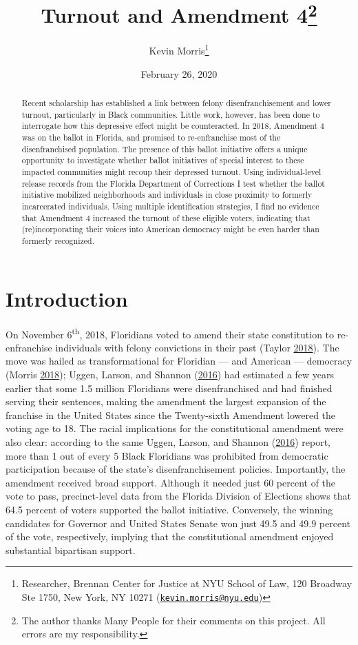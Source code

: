 \documentclass[
  12pt,
]{article}
\title{Turnout and Amendment 4\thanks{The author thanks Many People for their comments on this project. All errors are my responsibility.}}
\author{Kevin Morris\footnote{Researcher, Brennan Center for Justice at NYU School of Law, 120 Broadway Ste 1750, New York, NY 10271 (\href{mailto:kevin.morris@nyu.edu}{\nolinkurl{kevin.morris@nyu.edu}})}}
\date{February 26, 2020}
\begin{document}
\maketitle
\begin{abstract}
Recent scholarship has established a link between felony disenfranchisement and lower turnout, particularly in Black communities. Little work, however, has been done to interrogate how this depressive effect might be counteracted. In 2018, Amendment 4 was on the ballot in Florida, and promised to re-enfranchise most of the disenfranchised population. The presence of this ballot initiative offers a unique opportunity to investigate whether ballot initiatives of special interest to these impacted communities might recoup their depressed turnout. Using individual-level release records from the Florida Department of Corrections I test whether the ballot initiative mobilized neighborhoods and individuals in close proximity to formerly incarcerated individuals. Using multiple identification strategies, I find no evidence that Amendment 4 increased the turnout of these eligible voters, indicating that (re)incorporating their voices into American democracy might be even harder than formerly recognized.
\end{abstract}

\pagebreak


\hypertarget{introduction}{%
\section*{Introduction}\label{introduction}}

On November 6\textsuperscript{th}, 2018, Floridians voted to amend their state constitution to re-enfranchise individuals with felony convictions in their past (Taylor \protect\hyperlink{ref-Taylor2018}{2018}). The move was hailed as transformational for Floridian --- and American --- democracy (Morris \protect\hyperlink{ref-Morris2018}{2018}); Uggen, Larson, and Shannon (\protect\hyperlink{ref-sentencing_2016}{2016}) had estimated a few years earlier that some 1.5 million Floridians were disenfranchised and had finished serving their sentences, making the amendment the largest expansion of the franchise in the United States since the Twenty-sixth Amendment lowered the voting age to 18. The racial implications for the constitutional amendment were also clear: according to the same Uggen, Larson, and Shannon (\protect\hyperlink{ref-sentencing_2016}{2016}) report, more than 1 out of every 5 Black Floridians was prohibited from democratic participation because of the state's disenfranchisement policies. Importantly, the amendment received broad support. Although it needed just 60 percent of the vote to pass, precinct-level data from the Florida Division of Elections shows that 64.5 percent of voters supported the ballot initiative. Conversely, the winning candidates for Governor and United States Senate won just 49.5 and 49.9 percent of the vote, respectively, implying that the constitutional amendment enjoyed substantial bipartisan support.
\end{document}
